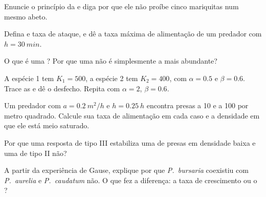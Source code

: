 \begin{exercise}[$\star$]\label{exo:b1:species-interactions:2}
Enuncie o princípio da  e diga por que ele não
proíbe cinco mariquitas num mesmo abeto.
\end{exercise}

\begin{exercise}[$\star$]\label{exo:b1:species-interactions:3}
Defina  e taxa de ataque, e dê a taxa máxima de
alimentação de um predador com $h = \qty{30}{min}$.
\end{exercise}

\begin{exercise}[$\star$]\label{exo:b1:species-interactions:4}
O que é uma ? Por que uma  não é
simplesmente a mais abundante?
\end{exercise}

\begin{exercise}[$\star\star$]\label{exo:b1:species-interactions:5}
A espécie 1 tem $K_1 = 500$, a espécie 2 tem $K_2 = 400$, com $\alpha =
0.5$ e $\beta = 0.6$. Trace as  e dê o desfecho. Repita com
$\alpha = 2$, $\beta = 0.6$.
\end{exercise}

\begin{exercise}[$\star\star$]\label{exo:b1:species-interactions:6}
Um predador com $a = \qty{0.2}{m^2/h}$ e $h = \qty{0.25}{h}$ encontra
presas a \qty{10}{} e a \qty{100}{} por metro quadrado. Calcule sua
taxa de alimentação em cada caso e a densidade em que ele está meio
saturado.
\end{exercise}

\begin{exercise}[$\star\star$]\label{exo:b1:species-interactions:7}
Por que uma resposta de tipo III estabiliza uma  de presas em
densidade baixa e uma de tipo II não?
\end{exercise}

\begin{exercise}[$\star\star$]\label{exo:b1:species-interactions:8}
A partir da experiência de Gause, explique por que \emph{P.~bursaria}
coexistiu com \emph{P.~aurelia} e \emph{P.~caudatum} não. O que fez a
diferença: a taxa de crescimento ou o ?
\end{exercise}

